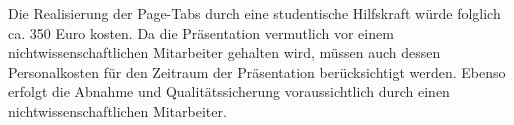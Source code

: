 Die Realisierung der Page-Tabs durch eine studentische Hilfskraft würde folglich ca. 350 Euro kosten. Da die Präsentation vermutlich vor einem nichtwissenschaftlichen Mitarbeiter gehalten wird, müssen auch dessen Personalkosten für den Zeitraum der Präsentation berücksichtigt werden. Ebenso erfolgt die Abnahme und Qualitätssicherung voraussichtlich durch einen nichtwissenschaftlichen Mitarbeiter.